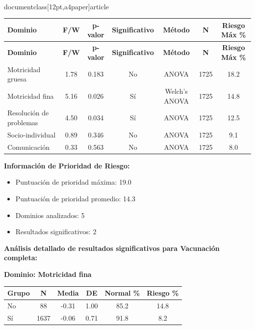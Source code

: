 \\documentclass[12pt,a4paper]{article}
\begin{document}
\begin{longtable}{|l|c|c|c|c|c|c|}
\hline
\textbf{Dominio} & \textbf{F/W} & \textbf{p-valor} & \textbf{Significativo} & \textbf{Método} & \textbf{N} & \textbf{Riesgo Máx \%} \\
\hline
\endfirsthead

\hline
\textbf{Dominio} & \textbf{F/W} & \textbf{p-valor} & \textbf{Significativo} & \textbf{Método} & \textbf{N} & \textbf{Riesgo Máx \%} \\
\hline
\endhead

\hline
\endfoot

\hline
\endlastfoot

Motricidad gruesa & 1.78 & 0.183 & No & ANOVA & 1725 & 18.2 \\
Motricidad fina & 5.16 & 0.026 & Sí & Welch's ANOVA & 1725 & 14.8 \\
Resolución de problemas & 4.50 & 0.034 & Sí & ANOVA & 1725 & 12.5 \\
Socio-individual & 0.89 & 0.346 & No & ANOVA & 1725 & 9.1 \\
Comunicación & 0.33 & 0.563 & No & ANOVA & 1725 & 8.0 \\

\end{longtable}


\textbf{Información de Prioridad de Riesgo:}
\begin{itemize}
\item Puntuación de prioridad máxima: 19.0
\item Puntuación de prioridad promedio: 14.3
\item Dominios analizados: 5
\item Resultados significativos: 2
\end{itemize}


\textbf{Análisis detallado de resultados significativos para Vacunación completa:}


\textbf{Dominio: Motricidad fina}


\begin{center}
\begin{tabular}{|l|c|c|c|c|c|}
\hline
\textbf{Grupo} & \textbf{N} & \textbf{Media} & \textbf{DE} & \textbf{Normal \%} & \textbf{Riesgo \%} \\
\hline
No & 88 & -0.31 & 1.00 & 85.2 & 14.8 \\
Sí & 1637 & -0.06 & 0.71 & 91.8 & 8.2 \\

\hline
\end{tabular}
\end{center}
\end{document}
